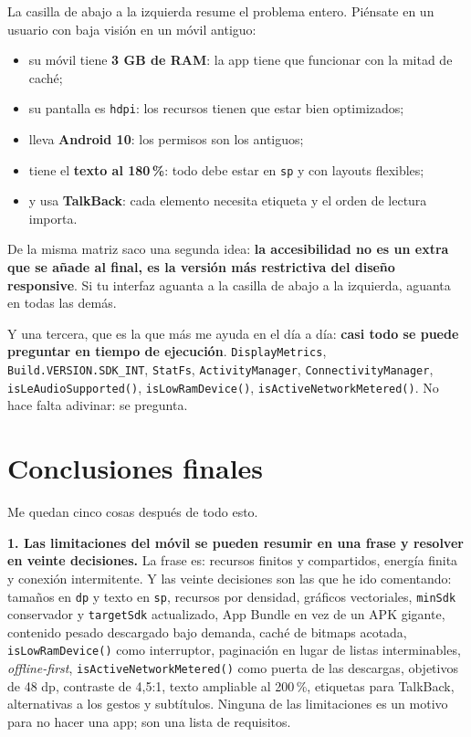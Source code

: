 \documentclass[11pt,a4paper]{article}
\newcommand{\code}[1]{\texttt{\color{primary}#1}}
\begin{document}
	La casilla de abajo a la izquierda resume el problema entero. Piénsate en un usuario con baja visión en un móvil antiguo:
	\begin{itemize}[leftmargin=*,itemsep=0.15em]
		\item su móvil tiene \textbf{3 GB de RAM}: la app tiene que funcionar con la mitad de caché;
		\item su pantalla es \code{hdpi}: los recursos tienen que estar bien optimizados;
		\item lleva \textbf{Android 10}: los permisos son los antiguos;
		\item tiene el \textbf{texto al 180\,\%}: todo debe estar en \code{sp} y con layouts flexibles;
		\item y usa \textbf{TalkBack}: cada elemento necesita etiqueta y el orden de lectura importa.
	\end{itemize}
	
	De la misma matriz saco una segunda idea: \textbf{la accesibilidad no es un extra que se añade al final, es la versión más restrictiva del diseño responsive}. Si tu interfaz aguanta a la casilla de abajo a la izquierda, aguanta en todas las demás.
	
	Y una tercera, que es la que más me ayuda en el día a día: \textbf{casi todo se puede preguntar en tiempo de ejecución}. \code{DisplayMetrics}, \code{Build.VERSION.SDK\_INT}, \code{StatFs}, \code{ActivityManager}, \code{ConnectivityManager}, \code{isLeAudioSupported()}, \code{isLowRamDevice()}, \code{isActiveNetworkMetered()}. No hace falta adivinar: se pregunta.
	
	\newpage
	\section*{Conclusiones finales}
	
	Me quedan cinco cosas después de todo esto.
	
	\textbf{1. Las limitaciones del móvil se pueden resumir en una frase y resolver en veinte decisiones.} La frase es: recursos finitos y compartidos, energía finita y conexión intermitente. Y las veinte decisiones son las que he ido comentando: tamaños en \code{dp} y texto en \code{sp}, recursos por densidad, gráficos vectoriales, \code{minSdk} conservador y \code{targetSdk} actualizado, App Bundle en vez de un APK gigante, contenido pesado descargado bajo demanda, caché de bitmaps acotada, \code{isLowRamDevice()} como interruptor, paginación en lugar de listas interminables, \emph{offline-first}, \code{isActiveNetworkMetered()} como puerta de las descargas, objetivos de 48 dp, contraste de 4,5:1, texto ampliable al 200\,\%, etiquetas para TalkBack, alternativas a los gestos y subtítulos. Ninguna de las limitaciones es un motivo para no hacer una app; son una lista de requisitos.
	
\end{document}
